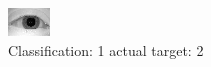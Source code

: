 \begin{figure}[h!]
\begin{center}
\includegraphics[width=0.60\columnwidth]{figures/ID891_class_1_target_2.png}
\end{center}
\caption{ Classification: 1 actual target: 2}
\label{fig:ID891_class_1_target_2}
\end{figure}

